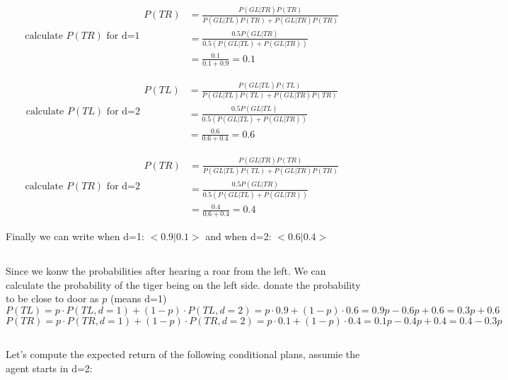 \documentclass{article}
\begin{document}
    \begin{equation}{\text{calculate $P(TR)$ for d=1}}
        \begin{split}
            P(TR) &= \frac{P(GL|TR)P(TR)}{P(GL|TL)P(TR)+ P(GL|TR)P(TR)}\\
            & = \frac{0.5P(GL|TR)}{0.5(P(GL|TL)+ P(GL|TR))}\\
            & = \frac{0.1}{0.1+0.9} = 0.1
        \end{split}
    \end{equation}
    
    \begin{equation}{\text{calculate $P(TL)$ for d=2}}
        \begin{split}
            P(TL) &= \frac{P(GL|TL)P(TL)}{P(GL|TL)P(TL)+ P(GL|TR)P(TR)}\\
            & = \frac{0.5P(GL|TL)}{0.5(P(GL|TL)+ P(GL|TR))}\\
            & = \frac{0.6}{0.6+0.4} = 0.6
        \end{split}
    \end{equation}
    
    \begin{equation}{\text{calculate $P(TR)$ for d=2}}
        \begin{split}
            P(TR) &= \frac{P(GL|TR)P(TR)}{P(GL|TL)P(TL)+ P(GL|TR)P(TR)}\\
            & = \frac{0.5P(GL|TR)}{0.5(P(GL|TL)+ P(GL|TR))}\\
            & = \frac{0.4}{0.6+0.4} = 0.4
        \end{split}
    \end{equation}

    Finally we can write when d=1: $< 0.9 |0.1>$ and when d=2: $<0.6 | 0.4 >$
    
    \subsection{}
    Since we konw the probabilities after hearing a roar from the left. We can calculate the probability of the tiger being on the left side. donate the probability to be close to door as $p$ (means d=1)\\
    \[
    P(TL) = p \cdot P(TL,d=1) + (1-p) \cdot P(TL,d=2) = p \cdot 0.9 + (1-p) \cdot 0.6 = 0.9p - 0.6p + 0.6 = 0.3p + 0.6
    \]
    \[
    P(TR) = p \cdot P(TR,d=1) + (1-p) \cdot P(TR,d=2) = p \cdot 0.1 + (1-p) \cdot 0.4 = 0.1p - 0.4p + 0.4 = 0.4 - 0.3p
    \]

    \subsection{}
    Let's compute the expected return of the following conditional plans, assumie the agent starts in d=2:
    
\end{document}
